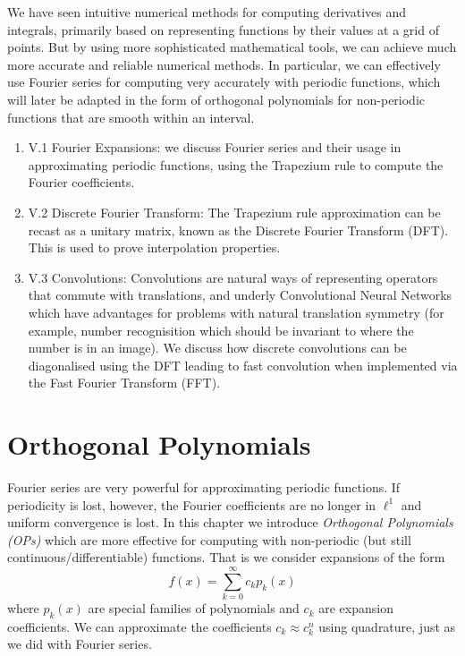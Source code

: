 \documentclass[12pt,a4paper]{book}
\theoremstyle{definition}
\begin{document}
  We have seen intuitive numerical methods for computing derivatives and integrals, 
  primarily based on representing functions by their values at a grid of points.
  But by using more sophisticated mathematical tools, we can achieve much more accurate and reliable
  numerical methods. In particular, we can effectively use Fourier series for computing very accurately with periodic functions,
  which will later be adapted in the form of orthogonal polynomials for non-periodic functions that are smooth within an interval.
  

  \begin{enumerate}
      \item V.1 Fourier Expansions: we discuss Fourier series and their usage in approximating periodic functions, using the Trapezium rule to compute the Fourier coefficients.
      \item V.2 Discrete Fourier Transform: The Trapezium rule approximation can be recast as a unitary matrix, known as the Discrete Fourier Transform (DFT). This is used to prove interpolation properties.
            \item V.3 Convolutions: Convolutions are natural ways of representing operators that commute with translations, and underly Convolutional Neural Networks which have advantages for problems with natural
            translation symmetry (for example, number recognisition which should be invariant to where the number is in an image). 
            We discuss how discrete convolutions can be diagonalised using the DFT leading to fast convolution when implemented via the Fast Fourier Transform (FFT).
 \end{enumerate}

 
 
  

\chapter{Orthogonal Polynomials}

Fourier series are very powerful for approximating periodic functions.
If periodicity is lost, however, the Fourier coefficients are no longer in $\ell^1$ and uniform convergence is lost.
In this chapter
we introduce {\it Orthogonal Polynomials (OPs)} which are more effective for computing with
non-periodic (but still continuous/differentiable) functions. That is we consider expansions of the form
$$
f(x) = \sum_{k=0}^\infty c_k p_k(x)
$$
where $p_k(x)$ are special families of polynomials and $c_k$ are expansion coefficients.
We can approximate the coefficients $c_k \approx c_k^n$ using quadrature, just as we did with Fourier series.
\end{document}
